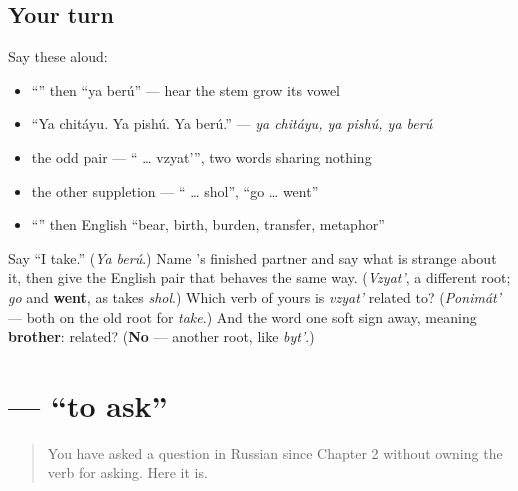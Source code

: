 \subsection*{Your turn}
Say these aloud:

\begin{itemize}
\raggedright
  \item \textquotedblleft{}\textquotedblright{} then \textquotedblleft{}ya berú\textquotedblright{} — hear the stem grow its vowel
  \item \textquotedblleft{}Ya chitáyu. Ya pishú. Ya berú.\textquotedblright{} — \emph{ya chitáyu, ya pishú, ya berú}
  \item the odd pair — \textquotedblleft{} … vzyat'\textquotedblright{}, two words sharing nothing
  \item the other suppletion — \textquotedblleft{} … shol\textquotedblright{}, \textquotedblleft{}go … went\textquotedblright{}
  \item \textquotedblleft{}\textquotedblright{} then English \textquotedblleft{}bear, birth, burden, transfer, metaphor\textquotedblright{}
\end{itemize}

\begin{tcolorbox}[breakable,colback=teal!4,colframe=teal!35!black,title={Before you move on}]
Say \textquotedblleft{}I take.\textquotedblright{} (\emph{Ya berú}.) Name \emph{}'s finished partner and say what is strange about it, then give the English pair that behaves the same way. (\emph{Vzyat'}, a different root; \emph{go} and \textbf{went}, as \emph{} takes \emph{shol}.) Which verb of yours is \emph{vzyat'} related to? (\emph{Ponimát'} — both on the old root for \emph{take}.) And the word one soft sign away, meaning \textbf{brother}: related? (\textbf{No} — another root, like \emph{byt'}.)
\end{tcolorbox}
\section[\texorpdfstring{\ru{спрашивать} (spráshivat')}{спрашивать (spráshivat')}]{ — \textquotedblleft{}to ask\textquotedblright{}}

\label{lesson:RU-C05-sprashivat}



\begin{quote}
You have asked a question in Russian since Chapter 2 without owning the verb for asking. Here it is.
\end{quote}

